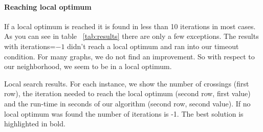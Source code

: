 \documentclass{scrartcl}
\begin{document}
\paragraph{Reaching local optimum}
If a local optimum is reached it is found in less than 10 iterations
in most cases.  As you can see in table ~\ref{tab:results} there are
only a few exceptions.  The results with iterations=$-1$ didn't reach
a local optimum and ran into our timeout condition. For many graphs,
we do not find an improvement. So with respect to our neighborhood, we
seem to be in a local optimum.









\begin{landscape}
\begin{table}
  \scriptsize
  
\caption{Local search results. For each instance, we show the number
  of crossings (first row), the iteration needed to reach the local
  optimum (second row, first value) and the run-time in seconds of our
  algorithm (second row, second value).  If no local optimum was found
  the number of iterations is -1. The best solution is highlighted in
  bold.}
\label{tab:results}
\end{table}
\end{landscape}
\end{document}
